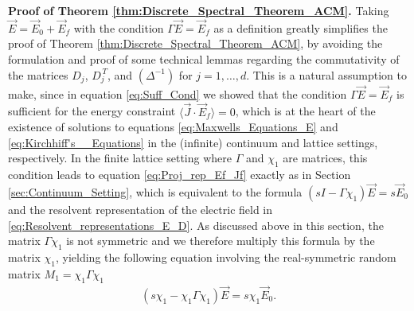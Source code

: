 \documentclass{cmslatex}
\begin{document}
\indent
\textbf{Proof of Theorem \ref{thm:Discrete_Spectral_Theorem_ACM}.}
Taking $\vec{E}=\vec{E}_0+\vec{E}_f$ with the 
condition $\Gamma\vec{E}=\vec{E}_f$ as a definition greatly simplifies the
proof of Theorem \ref{thm:Discrete_Spectral_Theorem_ACM}, by avoiding
the formulation and proof of some technical lemmas regarding the
commutativity of the matrices $D_j$, $D_j^{\,T}$, and $(\Delta^{-1})$ for
$j=1,\ldots,d$. This is a natural assumption to make, since in equation 
\eqref{eq:Suff_Cond} we showed that the condition $\Gamma\vec{E}=\vec{E}_f$
is sufficient for the energy constraint $\langle\vec{J}\cdot\vec{E}_f\rangle=0$, which
is at the heart of the existence of solutions to equations
\eqref{eq:Maxwells_Equations_E} and \eqref{eq:Kirchhiff's__Equations}
in the (infinite) continuum and lattice settings,
respectively. In the finite lattice setting where $\Gamma$ and $\chi_1$ are
matrices, this condition leads to equation \eqref{eq:Proj_rep_Ef_Jf}
exactly as in Section \eqref{sec:Continuum_Setting}, which is
equivalent to the formula $(sI-\Gamma\chi_1)\vec{E}=s\vec{E}_0$  and the  
resolvent representation of the electric field in
\eqref{eq:Resolvent_representations_E_D}. As discussed above in this
section, the matrix $\Gamma\chi_1$ is not symmetric and we therefore multiply
this formula by the matrix $\chi_1$, yielding the following equation
involving the real-symmetric random matrix $M_1=\chi_1\Gamma\chi_1$ 
%
\begin{align}\label{eq:Discrete_Resolvent}
  (s\chi_1-\chi_1\Gamma\chi_1)\vec{E}=s\chi_1\vec{E}_0.
\end{align}
%
\end{document}
